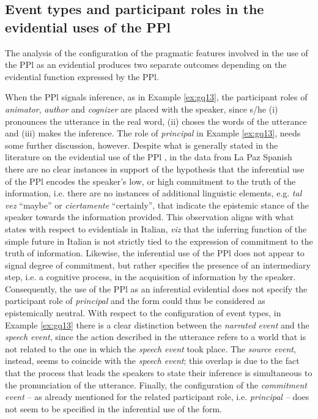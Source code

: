 \documentclass[output=paper]{langsci/langscibook}
\begin{document}
\subsection{Event types and participant roles in the evidential uses of the PPl}\label{s:gq4-3}

The analysis of the configuration of the pragmatic features involved in the use of the PPl as an evidential produces two separate outcomes depending on the evidential function expressed by the PPl. 

When the PPl signals inference, as in Example \ref{ex:gq13}, the participant roles of \textit{animator}, \textit{author} and \textit{cognizer} are placed with the speaker, since s/he (i) pronounces the utterance in the real word, (ii) choses the words of the utterance and (iii) makes the inference. The role of \textit{principal} in Example \ref{ex:gq13}, needs some further discussion, however. Despite what is generally stated in the literature on the evidential use of the PPl \citep{Speranza2014}, in the data from La Paz Spanish there are no clear instances in support of the hypothesis that the inferential use of the PPl encodes the speaker’s low, or high commitment to the truth of the information, i.e. there are no instances of additional linguistic elements, e.g. \textit{tal} \textit{vez} “maybe” or \textit{ciertamente} “certainly”, that indicate the epistemic stance of the speaker towards the information provided. This observation aligns with what \citet{Cornillie2009} states with respect to evidentials in Italian, \textit{viz} that the inferring function of the simple future in Italian is not strictly tied to the expression of commitment to the truth of information. Likewise, the inferential use of the PPl does not appear to signal degree of commitment, but rather specifies the presence of an intermediary step, i.e. a cognitive process, in the acquisition of information by the speaker. Consequently, the use of the PPl as an inferential evidential does not specify the participant role of \textit{principal} and the form could thus be considered as epistemically neutral. With respect to the configuration of event types, in Example \ref{ex:gq13} there is a clear distinction between the \textit{narrated} \textit{event} and the \textit{speech} \textit{event}, since the action described in the utterance refers to a world that is not related to the one in which the \textit{speech} \textit{event} took place. The \textit{source} \textit{event}, instead, seems to coincide with the \textit{speech} \textit{event}; this overlap is due to the fact that the process that leads the speakers to state their inference is simultaneous to the pronunciation of the utterance. Finally, the configuration of the \textit{commitment} \textit{event} – as already mentioned for the related participant role, i.e. \textit{principal} \textit{–} does not seem to be specified in the inferential use of the form.
\end{document}
